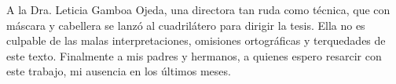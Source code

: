 \documentclass[14pt,twoside,final]{extbook} %
\begin{document}
A la Dra. Leticia Gamboa Ojeda, una directora tan ruda como técnica, que con máscara y cabellera se lanzó al cuadrilátero para dirigir la tesis. Ella no es culpable de las malas interpretaciones, omisiones ortográficas y terquedades de este texto. Finalmente a mis padres y hermanos, a quienes espero resarcir con este trabajo, mi ausencia en los últimos meses.
\cleardoublepage
\makeatletter
\renewcommand\@dotsep{200} %
\makeatother
\renewcommand{\contentsname}{Índice de contenidos}
\thispagestyle{empty}
\pagestyle{fancy}
\fancyhf{} %
\fancyhead[RO,LE]{\thepage}
\fancyfoot{}
\renewcommand{\headrulewidth}{0pt}
\tableofcontents
{}
\cleardoublepage
\makeatletter
\renewcommand\@dotsep{200} %
\makeatother
\renewcommand{\listtablename}{Índice de cuadros}
\listoftables
{}
\thispagestyle{empty}
\pagestyle{fancy}
\fancyhf{} %
\fancyhead[RO,LE]{\thepage}
\fancyfoot{}
\renewcommand{\headrulewidth}{0pt}
\makeatletter
\renewcommand\@dotsep{200} %
\makeatother
\renewcommand{\listfigurename}{Índice de imágenes}
\listoffigures
{}
\thispagestyle{empty}
\pagestyle{fancy}
\fancyhf{} %
\fancyhead[RO,LE]{\thepage}
\fancyfoot{}
\renewcommand{\headrulewidth}{0pt}
\end{document}
